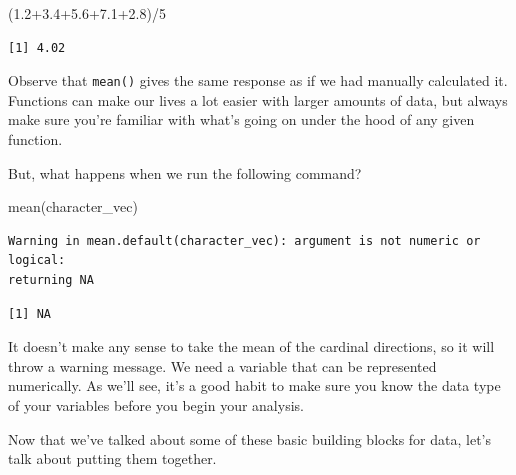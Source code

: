 \documentclass[
  letterpaper,
  DIV=11,
  numbers=noendperiod]{scrreprt}
\newenvironment{Shaded}{\begin{snugshade}}{\end{snugshade}}
\newcommand{\DecValTok}[1]{\textcolor[rgb]{0.68,0.00,0.00}{#1}}
\newcommand{\FloatTok}[1]{\textcolor[rgb]{0.68,0.00,0.00}{#1}}
\newcommand{\FunctionTok}[1]{\textcolor[rgb]{0.28,0.35,0.67}{#1}}
\newcommand{\NormalTok}[1]{\textcolor[rgb]{0.00,0.23,0.31}{#1}}
\newcommand{\SpecialCharTok}[1]{\textcolor[rgb]{0.37,0.37,0.37}{#1}}
\begin{document}
\begin{tcolorbox}[enhanced jigsaw, colframe=quarto-callout-note-color-frame, arc=.35mm, coltitle=black, breakable, rightrule=.15mm, left=2mm, opacitybacktitle=0.6, colbacktitle=quarto-callout-note-color!10!white, toptitle=1mm, bottomtitle=1mm, titlerule=0mm, leftrule=.75mm, colback=white, title=\textcolor{quarto-callout-note-color}{\faInfo}\hspace{0.5em}{Note}, opacityback=0, bottomrule=.15mm, toprule=.15mm]

\begin{Shaded}
\begin{Highlighting}[]
\NormalTok{(}\FloatTok{1.2+3.4+5.6+7.1+2.8}\NormalTok{)}\SpecialCharTok{/}\DecValTok{5}
\end{Highlighting}
\end{Shaded}

\begin{verbatim}
[1] 4.02
\end{verbatim}

Observe that \texttt{mean()} gives the same response as if we had
manually calculated it. Functions can make our lives a lot easier with
larger amounts of data, but always make sure you're familiar with what's
going on under the hood of any given function.

\end{tcolorbox}

But, what happens when we run the following command?

\begin{Shaded}
\begin{Highlighting}[]
\FunctionTok{mean}\NormalTok{(character\_vec)}
\end{Highlighting}
\end{Shaded}

\begin{verbatim}
Warning in mean.default(character_vec): argument is not numeric or logical:
returning NA
\end{verbatim}

\begin{verbatim}
[1] NA
\end{verbatim}

It doesn't make any sense to take the mean of the cardinal directions,
so it will throw a warning message. We need a variable that can be
represented numerically. As we'll see, it's a good habit to make sure
you know the data type of your variables before you begin your analysis.

Now that we've talked about some of these basic building blocks for
data, let's talk about putting them together.
\end{document}

